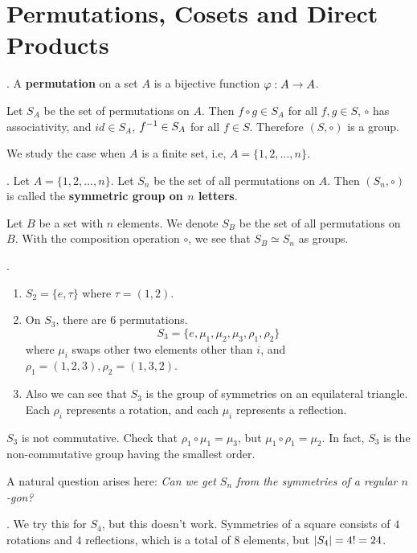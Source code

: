 \chapter{Permutations, Cosets and Direct Products}

\setcounter{topic}{7}

.  A \textbf{permutation} on a set \(A\) is a bijective function \(\varphi: A \rightarrow A\).

\rmk Let \(S_A\) be the set of permutations on \(A\). Then \(f \circ g \in S_A\) for all \(f, g \in S\), \(\circ\) has associativity, and \(id \in S_A\), \(f^{-1} \in S_A\) for all \(f \in S\). Therefore \((S, \circ)\) is a group.

We study the case when \(A\) is a finite set, i.e, \(A = \{1, 2, \dots, n\}\).

.  Let \(A = \{1, 2, \dots, n\}\). Let \(S_n\) be the set of all permutations on \(A\). Then \((S_n, \circ)\) is called the \textbf{symmetric group on \(n\) letters}.

Let \(B\) be a set with \(n\) elements. We denote \(S_B\) be the set of all permutations on \(B\). With the composition operation \(\circ\), we see that \(S_B \simeq S_n\) as groups.

\ex.
\begin{enumerate}
    \item \(S_2 = \{e, \tau\}\) where \(\tau = (1, 2)\).
    \item On \(S_3\), there are 6 permutations.
          \[
              S_3 = \{e, \mu_1, \mu_2, \mu_3, \rho_1, \rho_2\}
          \]
          where \(\mu_i\) swaps other two elements other than \(i\), and \(\rho_1 = (1, 2, 3), \rho_2 = (1, 3, 2)\).
    \item Also we can see that \(S_3\) is the group of symmetries on an equilateral triangle. Each \(\rho_i\) represents a rotation, and each \(\mu_i\) represents a reflection.
\end{enumerate}

\rmk \(S_3\) is not commutative. Check that \(\rho_1 \circ \mu_1 = \mu_3\), but \(\mu_1 \circ \rho_1 = \mu_2\). In fact, \(S_3\) is the non-commutative group having the smallest order.

A natural question arises here: \textit{Can we get \(S_n\) from the symmetries of a regular \(n\)-gon?}

\ex. We try this for \(S_4\), but this doesn't work. Symmetries of a square consists of \(4\) rotations and \(4\) reflections, which is a total of 8 elements, but \(\left| S_4 \right| = 4! = 24\).

